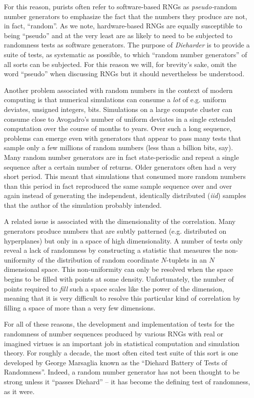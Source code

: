 \documentclass[12pt]{article}
\begin{document}
For this reason, purists often refer to software-based RNGs as {\em
pseudo-}random number generators to emphasize the fact that the numbers
they produce are not, in fact, ``random''.  As we note, hardware-based
RNGs are equally susceptible to being ``pseudo'' and at the very least
are as likely to need to be subjected to randomness tests as software
generators.  The purpose of {\em Dieharder} is to provide a suite of
tests, as systematic as possible, to which ``random number generators''
of all sorts can be subjected.  For this reason we will, for brevity's
sake, omit the word ``pseudo'' when discussing RNGs but it should
nevertheless be understood.

Another problem associated with random numbers in the context of modern
computing is that numerical simulations can consume a {\em lot} of e.g.
uniform deviates, unsigned integers, bits.  Simulations on a large
compute cluster can consume close to Avogadro's number of uniform
deviates in a single extended computation over the course of months to
years.  Over such a long sequence, problems can emerge even with
generators that appear to pass many tests that sample only a few
millions of random numbers (less than a billion bits, say).  Many random
number generators are in fact state-periodic and repeat a single
sequence after a certain number of returns.  Older generators often had
a very short period.  This meant that simulations that consumed more
random numbers than this period in fact reproduced the same sample
sequence over and over again instead of generating the independent,
identically distributed ({\em iid}) samples that the author of the
simulation probably intended.

A related issue is associated with the dimensionality of the
correlation.  Many generators produce numbers that are subtly patterned
(e.g. distributed on hyperplanes) but only in a space of high
dimensionality.  A number of tests only reveal a lack of randomness by
constructing a statistic that measures the non-uniformity of the
distribution of random coordinate $N$-tuplets in an $N$ dimensional
space.  This non-uniformity can only be resolved when the space begins
to be filled with points at some density.  Unfortunately, the number of
points required to {\em fill} such a space scales like the power of the
dimension, meaning that it is very difficult to resolve this particular
kind of correlation by filling a space of more than a very few
dimensions.

For all of these reasons, the development and implementation of tests
for the randomness of number sequences produced by various RNGs with
real or imagined virtues is an important job in statistical computation
and simulation theory.  For roughly a decade, the most often cited test
suite of this sort is one developed by George Marsaglia known as the
``Diehard Battery of Tests of Randomness''\cite{Marsaglia}.  Indeed, a
random number generator has not been thought to be strong unless it
``passes Diehard'' -- it has become the defining test of randomness, as
it were.
\end{document}
